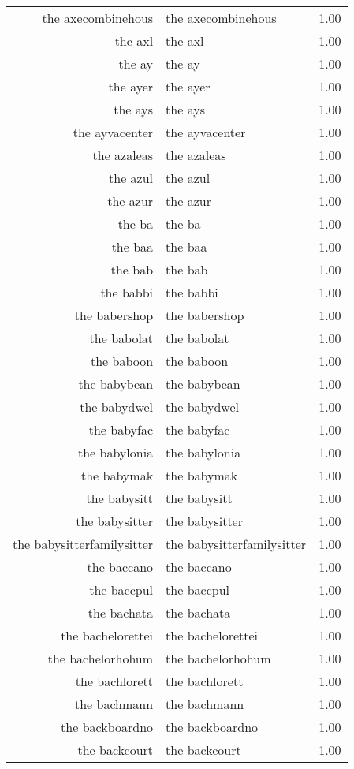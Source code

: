 \begin{table}[ht]
\begin{tabular}{rlr}
  the axecombinehous & the axecombinehous & 1.00 \\ 
  the axl & the axl & 1.00 \\ 
  the ay & the ay & 1.00 \\ 
  the ayer & the ayer & 1.00 \\ 
  the ays & the ays & 1.00 \\ 
  the ayvacenter & the ayvacenter & 1.00 \\ 
  the azaleas & the azaleas & 1.00 \\ 
  the azul & the azul & 1.00 \\ 
  the azur & the azur & 1.00 \\ 
  the ba & the ba & 1.00 \\ 
  the baa & the baa & 1.00 \\ 
  the bab & the bab & 1.00 \\ 
  the babbi & the babbi & 1.00 \\ 
  the babershop & the babershop & 1.00 \\ 
  the babolat & the babolat & 1.00 \\ 
  the baboon & the baboon & 1.00 \\ 
  the babybean & the babybean & 1.00 \\ 
  the babydwel & the babydwel & 1.00 \\ 
  the babyfac & the babyfac & 1.00 \\ 
  the babylonia & the babylonia & 1.00 \\ 
  the babymak & the babymak & 1.00 \\ 
  the babysitt & the babysitt & 1.00 \\ 
  the babysitter & the babysitter & 1.00 \\ 
  the babysitterfamilysitter & the babysitterfamilysitter & 1.00 \\ 
  the baccano & the baccano & 1.00 \\ 
  the baccpul & the baccpul & 1.00 \\ 
  the bachata & the bachata & 1.00 \\ 
  the bachelorettei & the bachelorettei & 1.00 \\ 
  the bachelorhohum & the bachelorhohum & 1.00 \\ 
  the bachlorett & the bachlorett & 1.00 \\ 
  the bachmann & the bachmann & 1.00 \\ 
  the backboardno & the backboardno & 1.00 \\ 
  the backcourt & the backcourt & 1.00 \\ 

\end{tabular}
\end{table}
